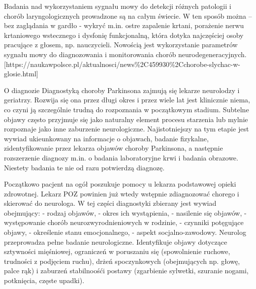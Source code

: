 Badania nad wykorzystaniem sygnału mowy do detekcji różnych patologii i chorób laryngologicznych prowadzone są na całym świecie.
W ten sposób można – bez zaglądania w gardło - wykryć m.in. ostre zapalenie krtani, porażenie nerwu krtaniowego wstecznego i dysfonię
funkcjonalną, która dotyka najczęściej osoby pracujące z głosem, np. nauczycieli.
Nowością jest wykorzystanie parametrów sygnału mowy do diagnozowania i monitorowania chorób neurodegeneracyjnych.
[https://naukawpolsce.pl/aktualnosci/news\%2C459930\%2Cchorobe-slychac-w-glosie.html]

O diagnozie\cite{diagnostyka_Sitek}
Diagnostyką choroby Parkinsona zajmują się lekarze neurolodzy i geriatrzy.
Rozwija się ona przez długi okres  i przez wiele lat jest klinicznie niema, co czyni ją szczególnie trudną do rozpoznania w początkowym stadium.
Subtelne objawy często przyjmuje się jako naturalny element procesu starzenia lub mylnie rozpoznaje jako inne zaburzenie neurologiczne.
Najistotniejszy na tym etapie jest wywiad ukieunkowany na informacje o objawach, badanie fizykalne, zidentyfikowanie przez
lekarza objawów choroby Parkinsona, a następnie rozszerzenie diagnozy m.in. o badania laboratoryjne krwi i badania obrazowe.
Niestety badania te nie od razu potwierdzą diagnozę.

Początkowo pacjent na ogół poszukuje pomocy u lekarza podstawowej opieki zdrowotnej.
Lekarz POZ powinien już wtedy wstępnie zdiagnozować chorego i skierować do neurologa.
W tej części diagnostyki zbierany jest wywiad obejmujący:
- rodzaj objawów,
- okres ich wystąpienia,
- nasilenie się objawów,
- występowanie chorób neurozwyrodnieniowych w rodzinie,
- czynniki potęgujące objawy,
- określenie stanu emocjonalnego,
- aspekt socjalno-zawodowy.
Neurolog przeprowadza pełne badanie neurologiczne.
Identyfikuje objawy dotyczące sztywności mięśniowej, ograniczeń w poruszaniu się (spowolnienie ruchowe, trudności z podjęciem ruchu),
drżeń spoczynkowych (obejmujących np. głowę, palce rąk) i zaburzeń stabilnoośći postawy (zgarbienie sylwetki, szuranie nogami, potknięcia, częste upadki).

